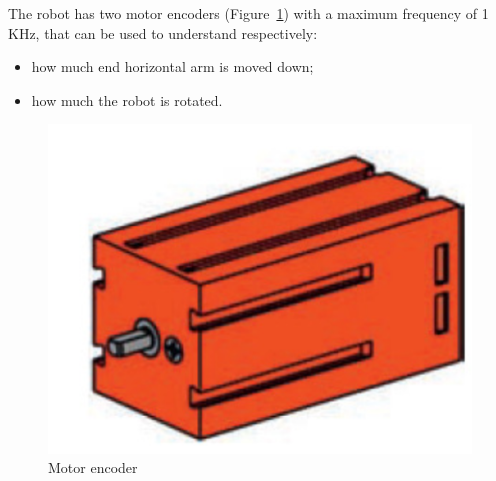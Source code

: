 \documentclass[a4paper,11pt]{report}
\theoremstyle{definition}
\theoremstyle{plain}
\begin{document}
            \bigskip
            The robot has two motor encoders (Figure~\ref{encod}) with a maximum frequency of 1 KHz, that can be used to understand respectively:
            \begin{itemize}
                \item how much end horizontal arm is moved down;
                \item how much the robot is rotated.
            \end{itemize}
            \begin{figure}[H] %
                \includegraphics[scale=0.38]{images/encod.png}
                \centering
                \caption{Motor encoder}
                \label{encod}
            \end{figure}
\end{document}
